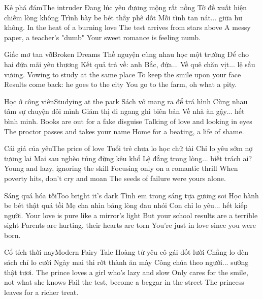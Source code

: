 \begin{tutuyetbox}{Kẻ phá đám}{The intruder}
Đang lúc yêu đương mộng rất nồng
Tờ đề xuất hiện chiếm lòng không
Trình bày be bét thầy phê dốt
Mối tình tan nát... giữa hư không.
\tcblower
In the heat of a burning love
The test arrives from stars above
A messy paper, a teacher's "dumb"
Your sweet romance is feeling numb.
\end{tutuyetbox}

\begin{tutuyetbox}{Giấc mơ tan vỡ}{Broken Dreams}
Thề nguyện cùng nhau học một trường
Để cho hai đứa mãi yêu thương
Kết quả trả về: anh Bắc, đứa...
Về quê chăn vịt... lệ sầu vương.
\tcblower
Vowing to study at the same place
To keep the smile upon your face
Results come back: he goes to the city
You go to the farm, oh what a pity.
\end{tutuyetbox}

\begin{tutuyetbox}{Học ở công viên}{Studying at the park}
Sách vở mang ra để trá hình
Cùng nhau tâm sự chuyện đôi mình
Giám thị đi ngang ghi biên bản
Về nhà ăn gậy... hết bình minh.
\tcblower
Books are out for a fake disguise
Talking of love and looking in eyes
The proctor passes and takes your name
Home for a beating, a life of shame.
\end{tutuyetbox}

\begin{tutuyetbox}{Cái giá của yêu}{The price of love}
Tuổi trẻ chưa lo học chữ tài
Chỉ lo yêu sớm nợ tương lai
Mai sau nghèo túng đừng kêu khổ
Lệ đắng trong lòng... biết trách ai?
\tcblower
Young and lazy, ignoring the skill
Focusing only on a romantic thrill
When poverty hits, don't cry and moan
The seeds of failure were yours alone.
\end{tutuyetbox}

\begin{tutuyetbox}{Sáng quá hóa tối}{Too bright it's dark}
Tình em trong sáng tựa gương soi
Học hành be bét thật quá tồi
Mẹ cha nhìn bảng lòng đau nhói
Con chỉ lo yêu... hết kiếp người.
\tcblower
Your love is pure like a mirror's light
But your school results are a terrible sight
Parents are hurting, their hearts are torn
You're just in love since you were born.
\end{tutuyetbox}

\begin{tutuyetbox}{Cổ tích thời nay}{Modern Fairy Tale}
Hoàng tử yêu cô gái dốt lười
Chẳng lo đèn sách chỉ lo cười
Ngày mai thi rớt thành ăn mày
Công chúa theo người... sướng thật tươi.
\tcblower
The prince loves a girl who's lazy and slow
Only cares for the smile, not what she knows
Fail the test, become a beggar in the street
The princess leaves for a richer treat.
\end{tutuyetbox}

